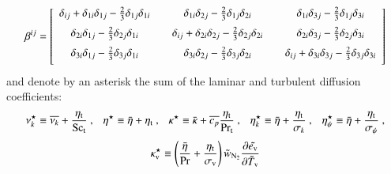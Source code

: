 \documentclass{warpdoc}
\newcommand{\alb}{\vspace{0.2cm}\\} %
\newcommand{\Cp}{{c_{p}}}
\newcommand{\Sct}{{{\rm Sc}_{\rm t}}}
\newcommand{\Prt}{{{\rm Pr}_{\rm t}}}
\newcommand{\turb}{_{\rm t}}
\newcommand{\etat}{{\eta\turb}}
\newcommand{\mfd}{\displaystyle}
\newcommand{\ev}{e_{\rm v}}
\begin{document}
\begin{displaymath}
  \beta^{ij}=\left[
    \begin{array}{ccccc}
      \delta_{ij}+\delta_{1i}\delta_{1j}-\frac{2}{3}\delta_{1j}\delta_{1 i}  &   &  \delta_{1i}\delta_{2 j}-\frac{2}{3}\delta_{1j}\delta_{2 i}  &    & \delta_{1i}\delta_{3 j}-\frac{2}{3}\delta_{1j}\delta_{3 i} \alb
      \delta_{2i}\delta_{1j}-\frac{2}{3}\delta_{2j}\delta_{1 i}  &   &  \delta_{ij}+\delta_{2i}\delta_{2 j}-\frac{2}{3}\delta_{2j}\delta_{2 i}  &    & \delta_{2i}\delta_{3 j}-\frac{2}{3}\delta_{2j}\delta_{3 i} \alb
      \delta_{3i}\delta_{1j}-\frac{2}{3}\delta_{3j}\delta_{1 i}  &   &  \delta_{3i}\delta_{2 j}-\frac{2}{3}\delta_{3j}\delta_{2 i}  &    & \delta_{ij}+\delta_{3i}\delta_{3 j}-\frac{2}{3}\delta_{3j}\delta_{3 i} \alb
    \end{array}
  \right]
\end{displaymath}
%
and denote by an asterisk the sum of the laminar and turbulent
diffusion coefficients:
%
\begin{displaymath}
 \begin{array}{c}\mfd
 \nu_k^\star\equiv\overline{\nu_k}+\frac{\etat}{\Sct}
~,~~~          \eta^\star\equiv\wbar{\eta}+\etat
~,~~~         \kappa^\star\equiv\wbar{\kappa}+\overline{\Cp} \frac{\etat}{\Prt}
~,~~~          \eta_k^\star\equiv\wbar{\eta}+\frac{\etat}{\sigma_k}
~,~~~          \eta_\psi^\star\equiv\wbar{\eta}+\frac{\etat}{\sigma_\psi}~,\alb\mfd
 \kappa_{\rm v}^\star \equiv \left( \frac{\wbar{\eta}}{\rm Pr}+\frac{\etat}{\sigma_{\rm v}} \right)\wtilde{w}_{\rm N_2}
       \frac{\partial {\wtilde{\ev}}}{\partial {\wtilde{T}_{\rm v}}}
 \end{array}
\end{displaymath}
%
\end{document}
